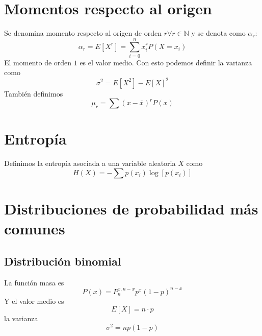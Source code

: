 \documentclass{./Probabilidad.tex}
\begin{document}
\section{Momentos respecto al origen}
Se denomina momento respecto al origen de orden $r \forall r \in \mathbb{N}$ y se denota como $\alpha_{r}$:
$$
\alpha_{r}=E[X^{r}] = \sum_{i=0}^{n} x_{i}^{r}P(X=x_{i})
$$
El momento de orden $1$ es el valor medio. Con esto podemos definir la varianza como
$$
\sigma^{2}=E[X^{2}]-E[X]^{2}
$$
También definimos
$$
\mu_{r} = \sum(x-\bar{x})^rP(x)
$$
\section{Entropía}
Definimos la entropía asociada a una variable aleatoria $X$ como
$$
H(X)= -\sum p(x_{i}) \log[p(x_{i})]
$$
\section{Distribuciones de probabilidad más comunes}
\subsection{Distribución binomial}
La función masa es
\[
	P(x) = P_{n}^{x,n-x}p^{x}(1-p)^{n-x}
\]
Y el valor medio es
\[
	E[X] = n\cdot p
\]
la varianza
\[
	\sigma ^{2}= np(1-p)
\]
\end{document}

